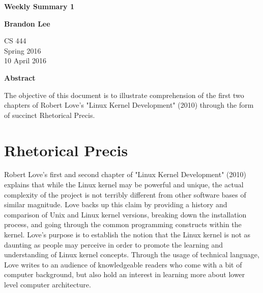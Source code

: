 \documentclass[letterpaper,10pt,titlepage]{article}
\begin{document}
\begin{titlepage}
    \begin{center}
        \vspace*{3.5cm}

        \textbf{Weekly Summary 1}

        \vspace{0.5cm}

        \textbf{Brandon Lee}

        \vspace{0.8cm}

        CS 444\\
        Spring 2016\\
        10 April 2016\\

        \vspace{1cm}

        \textbf{Abstract}\\

        \vspace{0.5cm}

        The objective of this document is to illustrate comprehension of the first two chapters of Robert Love's "Linux Kernel Development" (2010) through the form of succinct Rhetorical Precis.

        \vfill



    \end{center}
\end{titlepage}

\newpage

\section{Rhetorical Precis}

Robert Love's first and second chapter of "Linux Kernel Development" (2010) explains that while the Linux kernel may be powerful and unique, the actual complexity of the project is not terribly different from other software bases of similar magnitude.  Love backs up this claim by providing a history and comparison of Unix and Linux kernel versions, breaking down the installation process, and going through the common programming constructs within the kernel.  Love's purpose is to establish the notion that the Linux kernel is not as daunting as people may perceive in order to promote the learning and understanding of Linux kernel concepts.  Through the usage of technical language, Love writes to an audience of knowledgeable readers who come with a bit of computer background, but also hold an interest in learning more about lower level computer architecture.
\end{document}

